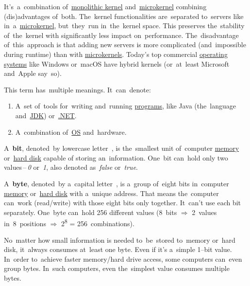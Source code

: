 \label{hybridkernel}
It's~a~combination of~\hyperref[monolithickernel]{monolithic kernel} and~\hyperref[microkernel]{microkernel} combining (dis)advantages of~both.
The~kernel functionalities are~separated to~servers like in~a~\hyperref[microkernel]{microkernel}, but~they~run in~the~kernel space.
This preserves the~stability of~the~kernel with significantly less impact on~performance.
The~disadvantage of~this~approach is that adding new servers is more complicated (and~impossible during runtime) than with \hyperref[microkernel]{microkernels}.
Today's top commercial \hyperref[os]{operating systems} like Windows or~macOS have hybrid kernels (or~at~least Microsoft and~Apple say~so).

\label{platform}
This term has~multiple meanings.
It~can~denote:
\begin{enumerate}[label=\arabic*)]
    \item A~set of~tools for~writing and~running \hyperref[applicationprocessprogramservicethread]{programs}, like Java (the~language and~\hyperref[jdkjrejvm]{JDK}) or~\hyperref[dotnet]{.NET}.
    \item A~combination of~\hyperref[os]{OS} and~hardware.
\end{enumerate}

\label{bitsandbytes}
A~\textbf{bit}, denoted~by lowercase letter~, is the~smallest unit of~computer \hyperref[systemmemory]{memory} or~\hyperref[harddiskdrive]{hard disk} capable of storing an~information.
One~bit can~hold only two values\,--\,\textit{0} or~\textit{1}, also denoted as~\textit{false} or~\textit{true}.

A~\textbf{byte}, denoted~by a~capital letter~, is a~group of~eight bits in~computer \hyperref[systemmemory]{memory} or~\hyperref[harddiskdrive]{hard disk} with a~unique address.
That means the~computer can~work (read/write) with those eight bits only together.
It~can't use each bit separately.
One~byte can~hold 256 different values (8~bits $\Rightarrow$ 2~values in~8~positions $\Rightarrow$ 2\textsuperscript{8} = 256~combinations).

No~matter how small information is needed to~be~stored to~memory or~hard disk, it~always consumes at~least one byte.
Even if it's a~simple \mbox{1--bit}  value.
In~order to~achieve faster memory/hard drive access, some computers can~even group bytes.
In~such computers, even the~simplest  value consumes multiple bytes.

